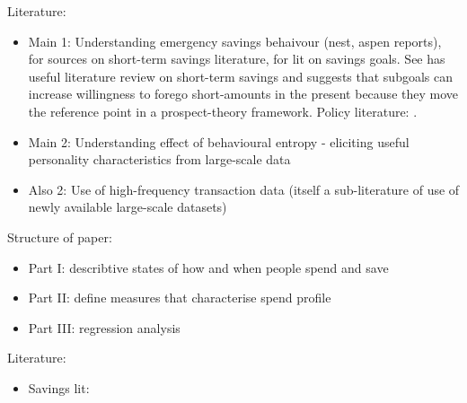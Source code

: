 Literature:
\begin{itemize}

    \item Main 1: Understanding emergency savings behaivour (nest, aspen
        reports), \citep{sabat2019rules} for sources on short-term savings
        literature, \citet{colby2013savings} for lit on savings goals.  See
        \citet{colby2013savings} has useful literature review on short-term
        savings and suggests that subgoals can increase willingness to forego
        short-amounts in the present because they move the reference point in a
        prospect-theory framework. Policy literature:
        \citep{can2019improving,cfpb2017financial, mps2018building}.



    \item Main 2: Understanding effect of behavioural entropy - eliciting
        useful personality characteristics from large-scale data

    \item Also 2: Use of high-frequency transaction data (itself a
        sub-literature of use of newly available large-scale datasets)

\end{itemize}


Structure of paper:


\begin{itemize}

    \item Part I: describtive states of how and when people spend and save

    \item Part II: define measures that characterise spend profile

    \item Part III: regression analysis

\end{itemize}


Literature:
\begin{itemize}
    \item Savings lit: \citet{lunt1991psychological, oaten2007improvements, }
\end{itemize}





